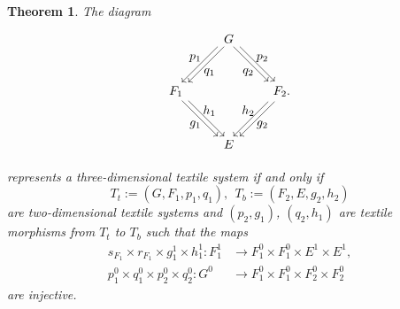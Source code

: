 \documentclass[a4paper,reqno,12pt]{amsart}
\newtheorem{thm}{Theorem}[section]
\theoremstyle{definition}
\theoremstyle{remark}
\begin{document}
\begin{thm}\label{th alternate description of 3D textile}
The diagram 
\[
\begin{tikzpicture}[scale=1]
\node[inner sep=2.5pt, circle] (B) at (-1.5,0) {$F_1$};
\node[inner sep=2.5pt, circle] (C) at (1.5,0) {$F_2.$};	
\node[inner sep=2.5pt, circle] (D) at (0,-1.5) {$E$};
\node[inner sep=2.5pt, circle] (A) at (0,1.5) {$G$}; 

\draw[transform canvas={xshift=0.6ex}, ->] (A) -- (B);
\draw[transform canvas={xshift=-0.6ex}, ->] (A) -- (B);

\draw[transform canvas={xshift=0.6ex}, ->] (A) -- (C);
\draw[transform canvas={xshift=-0.6ex}, ->] (A) -- (C);

\draw[transform canvas={xshift=0.6ex}, ->] (C) -- (D);
\draw[transform canvas={xshift=-0.6ex}, ->] (C) -- (D);

\draw[transform canvas={xshift=0.6ex}, ->] (B) -- (D);
\draw[transform canvas={xshift=-0.6ex}, ->] (B) -- (D);

\node at (-0.55,0.55) {$q_1$};
\node at (-0.95,0.95) {$p_1$};

\node at (0.55,0.55) {$q_2$};
\node at (0.95,0.95) {$p_2$};

\node at (-0.55,-0.55) {$h_1$};
\node at (-0.95,-0.95) {$g_1$};

\node at (0.55,-0.55) {$h_2$};
\node at (0.95,-0.95) {$g_2$};
\end{tikzpicture}
\] 
represents a three-dimensional textile system if and only if \[T_t:=(G,F_1,p_1,q_1),~~T_b:=(F_2,E,g_2,h_2)\] are two-dimensional textile systems and $(p_2,g_1)$, $(q_2,h_1)$ are textile morphisms from $T_t$ to $T_b$ such that the maps 
\begin{align*}
s_{F_1}\times r_{F_1}\times g_1^1\times h_1^1:F_1^1 &\longrightarrow F_1^0\times F_1^0\times E^1\times E^1,\\
p_1^0\times q_1^0\times p_2^0\times q_2^0:G^0 &\longrightarrow F_1^0\times F_1^0\times F_2^0\times F_2^0
\end{align*}
are injective.
\end{thm}
\end{document}
